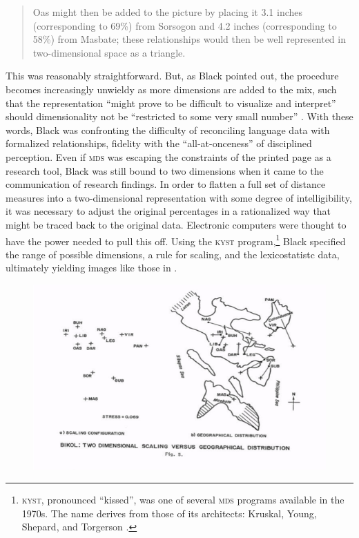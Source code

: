 \documentclass[output=paper]{langscibook}
\begin{document}
\begin{quotation}
Oas might then be added to the picture by placing it 3.1 inches (corresponding to 69\%) from Sorsogon and 4.2 inches (corresponding to 58\%) from Masbate; these relationships would then be well represented in two-dimensional space as a triangle. \citep[52]{Black1973}
\end{quotation}

This was reasonably straightforward. But, as Black pointed out, the procedure becomes increasingly unwieldy as more dimensions are added to the mix, such that the representation ``might prove to be difficult to visualize and interpret'' should dimensionality not be ``restricted to some very small number'' \citep[53]{Black1973}. With these words, Black was confronting the difficulty of reconciling language data with formalized relationships, fidelity with the ``all-at-onceness'' of disciplined perception. Even if \textsc{mds} was escaping the constraints of the printed page as a research tool, Black was still bound to two dimensions when it came to the communication of research findings. In order to flatten a full set of distance measures into a two-dimensional representation with some degree of intelligibility, it was necessary to adjust the original percentages in a rationalized way that might be traced back to the original data. Electronic computers were thought to have the power needed to pull this off. Using the \textsc{kyst} program,\footnote{\textsc{kyst}, pronounced ``kissed'', was one of several \textsc{mds} programs available in the 1970s. The name derives from those of its architects: Kruskal, Young, Shepard, and Torgerson \citep[see][]{Kruskaletal1973}.} Black specified the range of possible dimensions, a rule for scaling, and the lexicostatistc data, ultimately yielding images like those in .

\begin{figure}
    \centering
    \includegraphics[scale=1]{figures/black1973.png}
    \caption{\citet{Black1973}}
    \label{fig:kaplan:black1973}
\end{figure}
\end{document}
